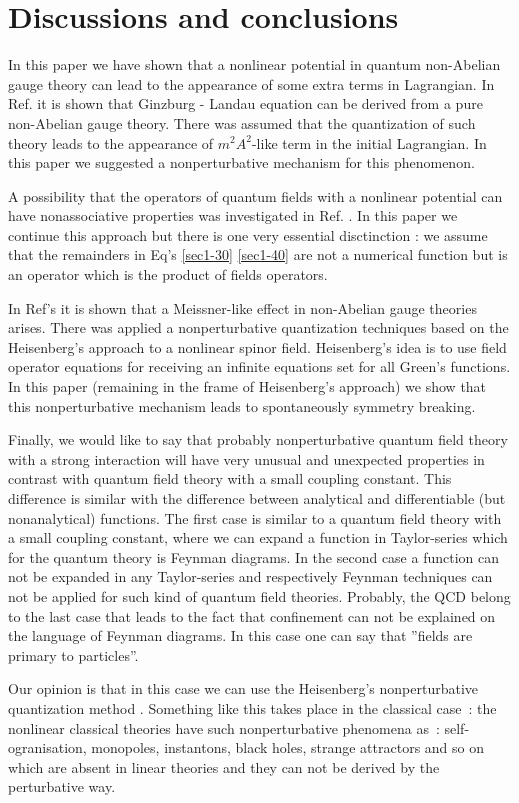 \documentclass[a4paper,a4paper]{article}
\begin{document}
\section{Discussions and conclusions}

In this paper we have shown that a nonlinear potential in 
quantum non-Abelian gauge theory can lead to the appearance 
of some extra terms in Lagrangian. In Ref. \cite{dzhsin} 
it is shown that Ginzburg - Landau equation can be derived from a pure 
non-Abelian gauge theory. There was assumed that the quantization 
of such theory leads to the appearance of $m^2 A^2$-like 
term in the initial Lagrangian. In this paper we suggested a 
nonperturbative mechanism for this phenomenon. 
\par 
A possibility that the operators of quantum fields with a nonlinear 
potential can have nonassociative properties was investigated 
in Ref. \cite{dzhsin2} . In this paper we continue this approach 
but there is one very essential disctinction : we assume that 
the remainders in Eq's \eqref{sec1-30} \eqref{sec1-40} are not 
a numerical function 
but is an operator which is the product of fields operators. 
\par
In Ref's \cite{dzhsin1} it is shown that a Meissner-like effect 
in non-Abelian gauge theories arises. There was applied 
a nonperturbative quantization techniques based on the 
Heisenberg's approach to a nonlinear spinor field. 
Heisenberg's idea is to  use field operator 
equations for receiving an infinite 
equations set for all Green's functions. In this paper (remaining in 
the frame of Heisenberg's approach) we show that this nonperturbative 
mechanism leads to spontaneously symmetry breaking. 
\par 
Finally, we would like to say that probably nonperturbative 
quantum field theory with a strong interaction 
will have very unusual and unexpected properties 
in contrast with quantum field theory with a small coupling constant. 
This difference is similar with the difference between analytical 
and differentiable (but nonanalytical) functions. The first case 
is similar to a quantum field theory with a small coupling constant, 
where we can expand a function in Taylor-series which for 
the quantum theory is Feynman diagrams. In the second case a 
function can not be expanded in any Taylor-series and respectively Feynman 
techniques can not be applied for such kind of quantum field theories. 
Probably, the QCD belong to the last case that leads to the fact that 
confinement can not be explained on the language of Feynman diagrams. 
In this case one can say \cite{hansson} that ''fields are primary 
to particles''. 
\par 
Our opinion is that in this case we can use the Heisenberg's 
nonperturbative quantization method \cite{heis}. 
Something like this takes place in the classical case~: 
the nonlinear classical theories have such nonperturbative phenomena 
as~: self-ogranisation, monopoles, instantons, black holes, strange attractors 
and so on which are absent in linear theories and they can not be 
derived by the perturbative way. 
\end{document}
